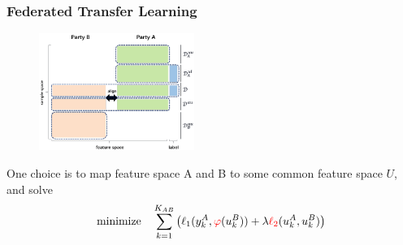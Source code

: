 
\begin{frame}
\frametitle{Federated Transfer Learning}

\begin{figure}
\centering
\includegraphics[width=0.45\textwidth,keepaspectratio]{images/transfer-fl.png}
\end{figure}

One choice \cite{liu_2020_transfer_fl} is to map feature space A and B to some common feature space $U$, and solve
$$
\text{minimize} \quad \sum_{k=1}^{K_{AB}} \left( \ell_1(y_k^A, {\color{red} \varphi}(u_k^B)) + \lambda {\color{red} \ell_2}(u_k^A, u_k^B)  \right)
$$


\end{frame}


